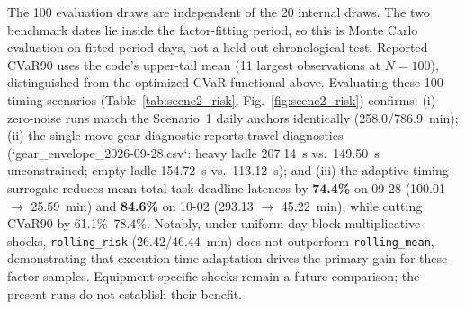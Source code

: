 \documentclass[11pt,a4paper]{article}
\begin{document}
The 100 evaluation draws are independent of the 20 internal draws. The two benchmark dates lie inside the factor-fitting period, so this is Monte Carlo evaluation on fitted-period days, not a held-out chronological test. Reported CVaR90 uses the code's upper-tail mean (11 largest observations at $N=100$), distinguished from the optimized CVaR functional above. Evaluating these 100 timing scenarios (Table~\ref{tab:scene2_risk}, Fig.~\ref{fig:scene2_risk}) confirms: (i) zero-noise runs match the Scenario~1 daily anchors identically (258.0/786.9~min); (ii) the single-move gear diagnostic reports travel diagnostics (`gear\_envelope\_2026-09-28.csv`: heavy ladle 207.14~s vs.\ 149.50~s unconstrained; empty ladle 154.72~s vs.\ 113.12~s); and (iii) the adaptive timing surrogate reduces mean total task-deadline lateness by \textbf{74.4\%} on 09-28 (100.01 $\rightarrow$ 25.59~min) and \textbf{84.6\%} on 10-02 (293.13 $\rightarrow$ 45.22~min), while cutting CVaR90 by 61.1\%--78.4\%. Notably, under uniform day-block multiplicative shocks, \texttt{rolling\_risk} (26.42/46.44~min) does not outperform \texttt{rolling\_mean}, demonstrating that execution-time adaptation drives the primary gain for these factor samples. Equipment-specific shocks remain a future comparison; the present runs do not establish their benefit.

\begin{table}[htbp]
\centering
\small
\caption{Scenario~2 Timing-Surrogate Evaluation (100 Independent Draws; Open-Loop vs.\ Adaptive Dispatch)}
\label{tab:scene2_risk}
\end{table}
\end{document}
